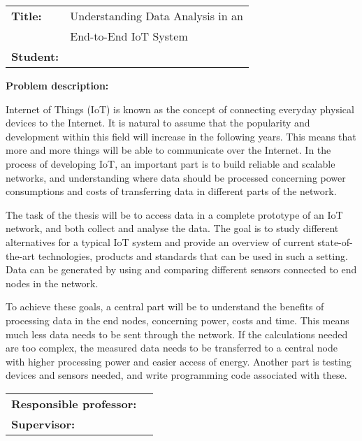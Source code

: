 \begin{titlingpage}

\noindent
\begin{tabular}{@{}p{4cm}l}
\textbf{Title:} 	& Understanding Data Analysis in an \\& End-to-End IoT System\\
\textbf{Student:}	& \theauthor \\
\end{tabular}

\vspace{4ex}
\noindent\textbf{Problem description:}
\vspace{2ex}

\noindent Internet of Things (IoT) is known as the concept of connecting everyday physical devices to the Internet. It is natural to assume that the popularity and development within this field will increase in the following years. This means that more and more things will be able to communicate over the Internet. In the process of developing IoT, an important part is to build reliable and scalable networks, and understanding where data should be processed concerning power consumptions and costs of transferring data in different parts of the network. 

\noindent The task of the thesis will be to access data in a complete prototype of an IoT network, and both collect and analyse the data. The goal is to study different alternatives for a typical IoT system and provide an overview of current state-of-the-art technologies, products and standards that can be used in such a setting. Data can be generated by using and comparing different sensors connected to end nodes in the network.

\noindent To achieve these goals, a central part will be to understand the benefits of processing data in the end nodes, concerning power, costs and time. This means much less data needs to be sent through the network. If the calculations needed are too complex, the measured data needs to be transferred to a central node with higher processing power and easier access of energy. Another part is testing devices and sensors needed, and write programming code associated with these. 

\vspace{6ex}

\noindent
\begin{tabular}{@{}p{4cm}l}
\textbf{Responsible professor:} 	& \theprofessor \\
\textbf{Supervisor:}			& \thesupervisor \\
\end{tabular}

\end{titlingpage}